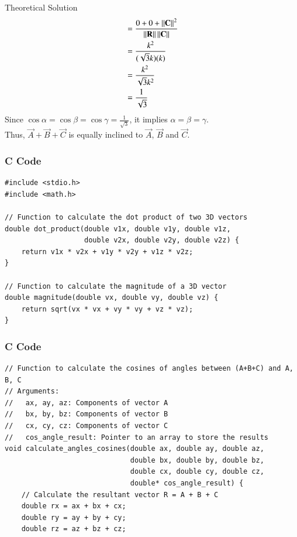 \documentclass{beamer}
\begin{document}
\begin{frame}{Theoretical Solution}
\begin{align}
&= \frac{0 + 0 + \left\lVert\mathbf{C}\right\rVert^2}{\left\lVert\mathbf{R}\right\rVert \left\lVert\mathbf{C}\right\rVert}   \\
&= \frac{k^2}{(\sqrt{3}k)(k)}   \\
&= \frac{k^2}{\sqrt{3}k^2}   \\
&= \frac{1}{\sqrt{3}}
\end{align}
Since $\cos \alpha = \cos \beta = \cos \gamma = \frac{1}{\sqrt{3}}$, it implies $\alpha = \beta = \gamma$.\\
Thus, $\vec{A}+\vec{B}+\vec{C}$ is equally inclined to $\vec{A}$, $\vec{B}$ and $\vec{C}$.
\end{frame}

\begin{frame}[fragile]
\frametitle{C Code}
\begin{lstlisting}
#include <stdio.h>
#include <math.h>

// Function to calculate the dot product of two 3D vectors
double dot_product(double v1x, double v1y, double v1z,
                   double v2x, double v2y, double v2z) {
    return v1x * v2x + v1y * v2y + v1z * v2z;
}

// Function to calculate the magnitude of a 3D vector
double magnitude(double vx, double vy, double vz) {
    return sqrt(vx * vx + vy * vy + vz * vz);
}
\end{lstlisting}
\end{frame}

\begin{frame}[fragile]
\frametitle{C Code}
\begin{lstlisting}
// Function to calculate the cosines of angles between (A+B+C) and A, B, C
// Arguments:
//   ax, ay, az: Components of vector A
//   bx, by, bz: Components of vector B
//   cx, cy, cz: Components of vector C
//   cos_angle_result: Pointer to an array to store the results
void calculate_angles_cosines(double ax, double ay, double az,
                              double bx, double by, double bz,
                              double cx, double cy, double cz,
                              double* cos_angle_result) {
    // Calculate the resultant vector R = A + B + C
    double rx = ax + bx + cx;
    double ry = ay + by + cy;
    double rz = az + bz + cz;
\end{lstlisting}
\end{frame}
\end{document}
